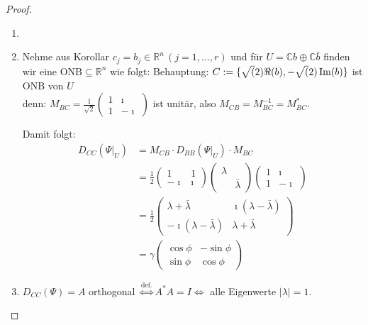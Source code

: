 \documentclass[parskip,a4paper,twoside,DIV15,BCOR12mm]{scrbook}
\begin{document}
\begin{proof}
\begin{enumerate}
\item \checkmark
\item Nehme aus Korollar \(c_{j}=b_{j}\in\mathbb{R}^{n}\,(j=1,\ldots,r)\) und
für \(U=\mathbb{C}b\oplus\mathbb{C}\bar{b}\) finden wir eine 
\(\text{ONB}\subseteq\mathbb{R}^{n}\) wie folgt:
Behauptung: \(C:=\{\sqrt(2)\Re(b),-\sqrt(2)\operatorname{Im}(b)\}\) ist ONB von \(U\)\\
denn: \(M_{BC}=\frac{1}{\sqrt{2}}\begin{pmatrix}1&\imath\\1&-\imath\end{pmatrix}\) ist unitär, also \(M_{CB}=M_{BC}^{-1}=M_{BC}^{*}\).

Damit folgt: 
\begin{align*}
D_{CC}(\Psi|_{U})&=M_{CB}\cdot D_{BB}(\Psi|_{U})\cdot M_{BC}\\
   &=\frac{1}{2}\begin{pmatrix}1&1\\-\imath&\imath\end{pmatrix}\begin{pmatrix}\lambda&\\&\bar{\lambda}\end{pmatrix}\begin{pmatrix}1&\imath\\1&-\imath\end{pmatrix}\\
    &=\frac{1}{2}\begin{pmatrix}\lambda+\bar{\lambda}&\imath(\lambda-\bar{\lambda})\\-\imath(\lambda-\bar{\lambda})&\lambda+\bar{\lambda}\end{pmatrix}\\
    &=\gamma\begin{pmatrix}\cos\phi&-\sin\phi\\\sin\phi&\cos\phi\end{pmatrix}
\end{align*}
\item \(D_{CC}(\Psi)=A\) orthogonal 
\(\overset{\text{def.}}{\Leftrightarrow}A^{*}A=I\Leftrightarrow\) alle
Eigenwerte \(\lvert\lambda\rvert=1\).
\end{enumerate}
\end{proof}
\end{document}
